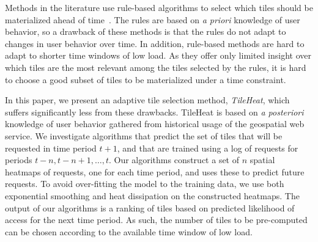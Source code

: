 \documentclass[11pt, oneside]{report}
\begin{document}
Methods in the literature use rule-based algorithms to select which tiles should be materialized ahead of time~\cite{quinn10}. The rules are based on \emph{a priori} knowledge of user behavior, so a drawback of these methods is that the rules do not adapt to changes in user behavior over time. In addition, rule-based methods are hard to adapt to shorter time windows of low load. As they offer only limited insight over which tiles are the most relevant among the tiles selected by the rules, it is hard to choose a good subset of tiles to be materialized under a time constraint.  

In this paper, we present an adaptive tile selection method, \emph{TileHeat}, which suffers significantly less from these drawbacks. TileHeat is based on  \emph{a posteriori} knowledge of user behavior gathered from historical usage of the geospatial web service. We investigate algorithms that predict the set of tiles that will be requested in time period $t + 1$, and that are trained using a log of requests for periods $t-n, t -n + 1, \ldots, t$. Our algorithms construct a set of $n$ spatial heatmaps of requests, one for each time period, and uses these to predict future requests. To avoid over-fitting the model to the training data, we use both exponential smoothing and heat dissipation on the constructed heatmaps. The output of our algorithms is a ranking of tiles based on predicted likelihood of access for the next time period. As such, the number of tiles to be pre-computed can be chosen according to the available time window of low load.	
\end{document}

